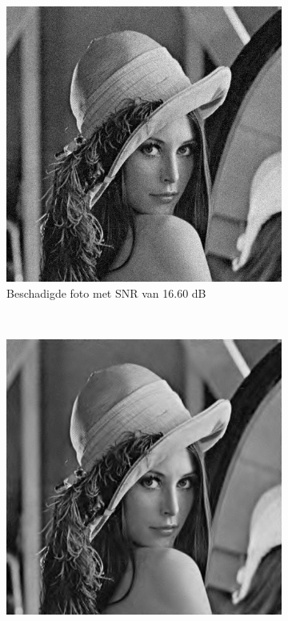 \begin{figure}
    \centering
    \begin{subfigure}[b]{0.4\textwidth}
        \includegraphics[width=\textwidth]{../src/denoising/redundant/redundant_noise}
        \caption{Beschadigde foto met SNR van 16.60 dB }
        \label{fig:redundant_noise}
    \end{subfigure}
    ~ %
    \begin{subfigure}[b]{0.4\textwidth}
        \includegraphics[width=\textwidth]{../src/denoising/redundant/redundant_fixed}

\end{subfigure}
\end{figure}
